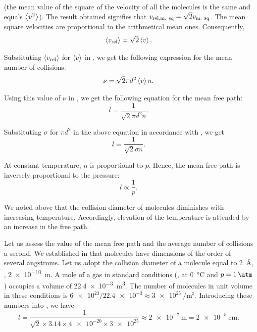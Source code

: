 \noindent
(the mean value of the square of the velocity of all the molecules is the same and equals $\left\langle v^2 \right\rangle$). The result obtained signifies that $v_{\text{rel,m. sq}}=\sqrt{2}v_{\text{m. sq}}$. The mean square velocities are proportional to the arithmetical mean ones. Consequently,
\begin{equation*}
    \left\langle v_{\text{rel}} \right\rangle = \sqrt{2}\left\langle v \right\rangle.
\end{equation*}

Substituting $\left\langle v_{\text{rel}} \right\rangle$ for $\left\langle v \right\rangle$ in , we get the following expression for the mean number of collisions:
\begin{equation}\label{eq:16_9}
    \nu = \sqrt{2}\pi d^2 \left\langle v \right\rangle n.
\end{equation}

\noindent
Using this value of $\nu$ in , we get the following equation for the mean free path:
\begin{equation}\label{eq:16_10}
    l = \frac{1}{\sqrt{2}\pi d^2 n}.
\end{equation}

\noindent
Substituting $\sigma$ for $\pi d^2$ in the above equation in accordance with , we get
\begin{equation}\label{eq:16_11}
    l = \frac{1}{\sqrt{2}\sigma n}.
\end{equation}

At constant temperature, $n$ is proportional to $p$. Hence, the mean free path is inversely proportional to the pressure:
\begin{equation}\label{eq:16_12}
    l \propto \frac{1}{p}.
\end{equation}

\noindent
We noted above that the collision diameter of molecules diminishes with increasing temperature. Accordingly, elevation of the temperature is attended by an increase in the free path.

Let us assess the value of the mean free path and the average number of collisions a second. We established in  that molecules have dimensions of the order of several angstroms. Let us adopt the collision diameter of a molecule equal to \SI{2}{\angstrom}, \ie, \SI{2e-10}{\metre}. A mole of a gas in standard conditions (\ie, at \SI{0}{\degreeCelsius} and $p=\SI{1}{\atm}$) occupies a volume of \SI{22.4e-3}{\metre\cubed}. The number of molecules in unit volume in these conditions is $\num{6e23}/\num{22.4e-3}\approx\SI{3e25}{\per\metre\cubed}$. Introducing these numbers into , we have
\begin{equation*}
    l = \frac{1}{\sqrt{2}\times 3.14\times \num{4e-20}\times\num{3e25}} \approx \SI{2e-7}{\metre} = \SI{2e-5}{\centi\metre}.
\end{equation*}

